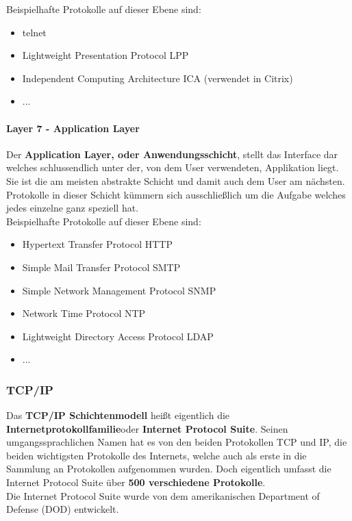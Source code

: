 \documentclass[12pt,a4paper]{report}
\begin{document}
Beispielhafte Protokolle auf dieser Ebene sind:
\begin{itemize}
\item telnet
\item Lightweight Presentation Protocol LPP
\item Independent Computing Architecture ICA (verwendet in Citrix)
\item ...
\end{itemize}

\paragraph{Layer 7 - Application Layer}
Der \textbf{Application Layer, oder Anwendungsschicht}, stellt das Interface dar welches schlussendlich unter der, von dem User verwendeten, Applikation liegt. Sie ist die am meisten abstrakte Schicht und damit auch dem User am nächsten. Protokolle in dieser Schicht kümmern sich ausschließlich um die Aufgabe welches jedes einzelne ganz speziell hat.\\

Beispielhafte Protokolle auf dieser Ebene sind:
\begin{itemize}
\item Hypertext Transfer Protocol HTTP
\item Simple Mail Transfer Protocol SMTP
\item Simple Network Management Protocol SNMP
\item Network Time Protocol NTP
\item Lightweight Directory Access Protocol LDAP
\item ...
\end{itemize}
\subsubsection{TCP/IP}\label{sssec:tcpip}
Das \textbf{TCP/IP Schichtenmodell} heißt eigentlich die \glqq \textbf{Internetprotokollfamilie}\grqq  oder \glqq \textbf{Internet Protocol Suite}\grqq . Seinen umgangssprachlichen Namen hat es von den beiden Protokollen TCP und IP, die beiden wichtigsten Protokolle des Internets, welche auch als erste in die Sammlung an Protokollen aufgenommen wurden. Doch eigentlich umfasst die Internet Protocol Suite über \textbf{500 verschiedene Protokolle}.\\
Die Internet Protocol Suite wurde von dem amerikanischen Department of Defense (DOD) entwickelt.\\
\end{document}
